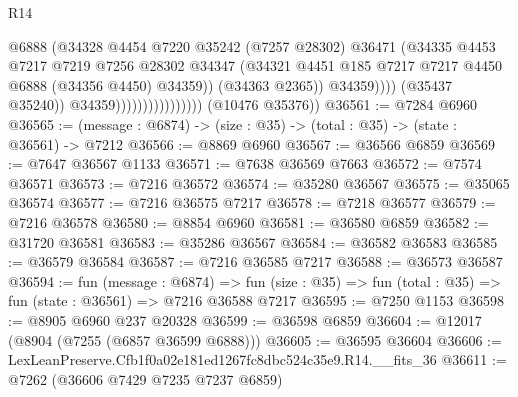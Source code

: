 \begin{lexlean}{R14}
\begin{coremodule}
                                                @6888
                                                (@34328
                                                  @4454
                                                  @7220
                                                  @35242
                                                  (@7257 @28302)
                                                  @36471
                                                  (@34335
                                                    @4453
                                                    @7217
                                                    @7219
                                                    @7256
                                                    @28302
                                                    @34347
                                                    (@34321
                                                      @4451
                                                      @185
                                                      @7217
                                                      @7217
                                                      @4450
                                                      @6888
                                                      (@34356 @4450)
                                                      @34359))
                                                  (@34363 @2365))
                                                @34359))))
                                        (@35437 @35240))
                                      @34359))))))))))))))))
      (@10476 @35376))
@36561 := @7284 @6960
@36565 := (message : @6874) -> (size : @35) -> (total : @35) -> (state : @36561) -> @7212
@36566 := @8869 @6960
@36567 := @36566 @6859
@36569 := @7647 @36567 @1133
@36571 := @7638 @36569 @7663
@36572 := @7574 @36571
@36573 := @7216 @36572
@36574 := @35280 @36567
@36575 := @35065 @36574
@36577 := @7216 @36575 @7217
@36578 := @7218 @36577
@36579 := @7216 @36578
@36580 := @8854 @6960
@36581 := @36580 @6859
@36582 := @31720 @36581
@36583 := @35286 @36567
@36584 := @36582 @36583
@36585 := @36579 @36584
@36587 := @7216 @36585 @7217
@36588 := @36573 @36587
@36594 := fun (message : @6874) =>
  fun (size : @35) => fun (total : @35) => fun (state : @36561) => @7216 @36588 @7217
@36595 := @7250 @1153
@36598 := @8905 @6960 @237 @20328
@36599 := @36598 @6859
@36604 := @12017 (@8904 (@7255 (@6857 @36599 @6888)))
@36605 := @36595 @36604
@36606 := LexLeanPreserve.Cfb1f0a02e181ed1267fc8dbc524c35e9.R14.__fits_36
@36611 := @7262 (@36606 @7429 @7235 @7237 @6859)

\end{coremodule}
\end{lexlean}
